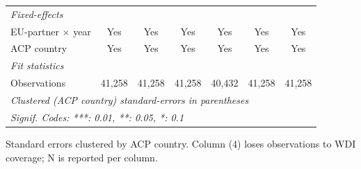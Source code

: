 \begin{tabular}{lcccccc}
   \midrule
   \emph{Fixed-effects}\\
   EU-partner $\times$ year     & Yes                            & Yes                              & Yes                              & Yes                                 & Yes                                       & Yes\\  
   ACP country                  & Yes                            & Yes                              & Yes                              & Yes                                 & Yes                                       & Yes\\  
   \midrule
   \emph{Fit statistics}\\
   Observations                 & 41,258                         & 41,258                           & 41,258                           & 40,432                              & 41,258                                    & 41,258\\  
   \midrule \midrule
   \multicolumn{7}{l}{\emph{Clustered (ACP country) standard-errors in parentheses}}\\
   \multicolumn{7}{l}{\emph{Signif. Codes: ***: 0.01, **: 0.05, *: 0.1}}\\
\end{tabular}
 
\par \raggedright 
Standard errors clustered by ACP country. Column (4) loses observations to WDI coverage; N is reported per column.
\par\endgroup


